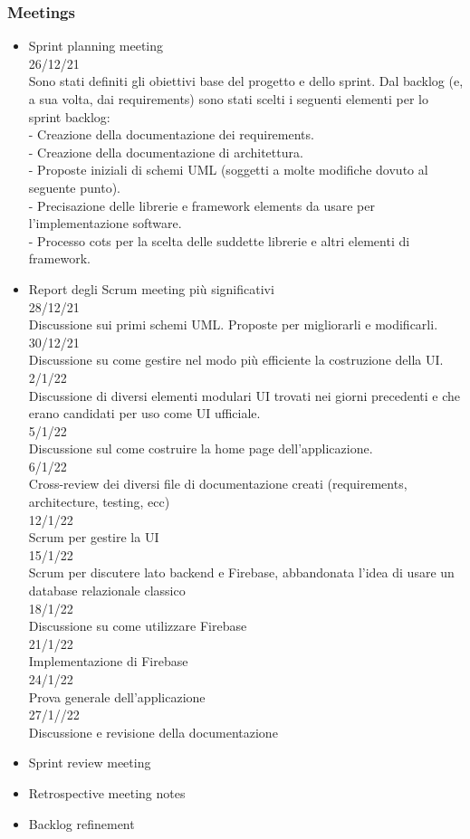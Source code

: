 \documentclass{article}
\begin{document}
\subsubsection{Meetings}
\begin{itemize}
\item Sprint planning meeting 
\\26/12/21 
\\Sono stati definiti gli obiettivi base del progetto e dello sprint. Dal backlog (e, a sua volta, dai requirements) sono stati scelti i seguenti elementi per lo sprint backlog:
\\-	Creazione della documentazione dei requirements.
\\-	Creazione della documentazione di architettura.
\\-	Proposte iniziali di schemi UML (soggetti a molte modifiche dovuto al seguente punto).
\\-	Precisazione delle librerie e framework elements da usare per l’implementazione software.
\\-	Processo cots per la scelta delle suddette librerie e altri elementi di framework.

\item Report degli Scrum meeting più significativi
\\28/12/21 
\\Discussione sui primi schemi UML. Proposte per migliorarli e modificarli.
\\30/12/21
\\Discussione su come gestire nel modo più efficiente la costruzione della UI.
\\2/1/22
\\Discussione di diversi elementi modulari UI trovati nei giorni precedenti e che erano candidati per uso come UI ufficiale. 
\\5/1/22
\\Discussione sul come costruire la home page dell’applicazione.
\\6/1/22
\\Cross-review dei diversi file di documentazione creati (requirements, architecture, testing, ecc) 
\\12/1/22
\\Scrum per gestire la UI
\\15/1/22
\\Scrum per discutere lato backend e Firebase, abbandonata l'idea di usare un database relazionale classico
\\18/1/22
\\Discussione su come utilizzare Firebase
\\21/1/22
\\Implementazione di Firebase 
\\24/1/22
\\Prova generale dell'applicazione
\\27/1//22
\\Discussione e revisione della documentazione
\item Sprint review meeting 
\item Retrospective meeting notes
\item Backlog refinement
\end{itemize}
\newpage
\end{document}
